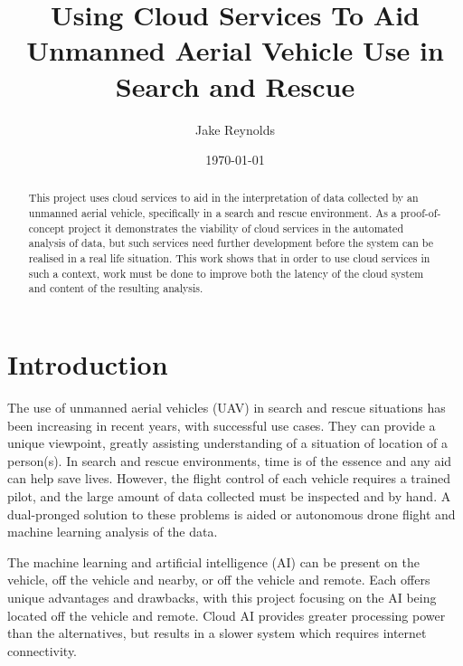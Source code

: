 \documentclass{article}
\begin{document}
\begin{titlingpage}

\title{Using Cloud Services To Aid Unmanned Aerial Vehicle Use in Search and Rescue}
\author{Jake Reynolds}
\date{\today}
\maketitle

\vspace*{\fill}

\begin{abstract}
\begin{large}
This project uses cloud services to aid in the interpretation of data collected by an unmanned aerial vehicle, specifically in a search and rescue environment. As a proof-of-concept project it demonstrates the viability of cloud services in the automated analysis of data, but such services need further development before the system can be realised in a real life situation. This work shows that in order to use cloud services in such a context, work must be done to improve both the latency of the cloud system and content of the resulting analysis.
\end{large}
\end{abstract}
\vspace*{\fill}
\end{titlingpage}

\tableofcontents


\section{Introduction}
The use of unmanned aerial vehicles (UAV) in search and rescue situations has been increasing in recent years, with successful use cases. They can provide a unique viewpoint, greatly assisting understanding of a situation of location of a person(s). In search and rescue environments, time is of the essence and any aid can help save lives. However, the flight control of each vehicle requires a trained pilot, and the large amount of data collected must be inspected and by hand. A dual-pronged solution to these problems is aided or autonomous drone flight and machine learning analysis of the data.

The machine learning and artificial intelligence (AI) can be present on the vehicle, off the vehicle and nearby, or off the vehicle and remote. Each offers unique advantages and drawbacks, with this project focusing on the AI being located off the vehicle and remote. Cloud AI provides greater processing power than the alternatives, but results in a slower system which requires internet connectivity. 
\end{document}
